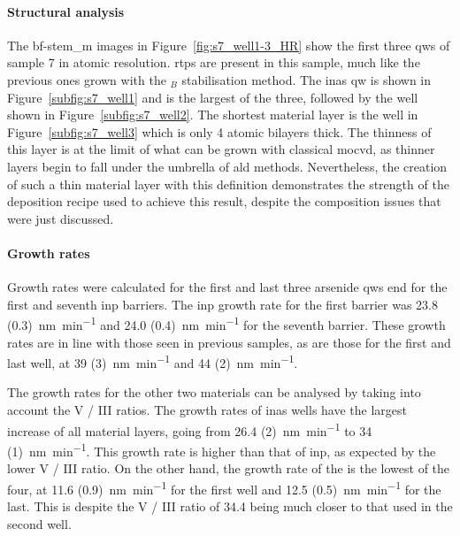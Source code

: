 \paragraph{Structural analysis} The \acs{bf}-\acs{stem_m} images in Figure~\ref{fig:s7_well1-3_HR} show the first three \acl{qw}s of sample 7 in atomic resolution. \Acl{rtp}s are present in this sample, much like the previous ones grown with the \(_B\) stabilisation method. The \acs{inas} \acs{qw} is shown in Figure~\ref{subfig:s7_well1} and is the largest of the three, followed by the  well shown in Figure~\ref{subfig:s7_well2}. The shortest material layer is the  well in Figure~\ref{subfig:s7_well3} which is only \num{4} atomic bilayers thick. The thinness of this layer is at the limit of what can be grown with classical \acs{mocvd}, as thinner layers begin to fall under the umbrella of \acf{ald} methods. Nevertheless, the creation of such a thin material layer with this definition demonstrates the strength of the deposition recipe used to achieve this result, despite the composition issues that were just discussed.
\par
\paragraph{Growth rates} Growth rates were calculated for the first and last three arsenide \acl{qw}s end for the first and seventh \acs{inp} barriers. The \acs{inp} growth rate for the first barrier was \qty[separate-uncertainty=true]{23.8 (0.3)}{\nano\metre\per\minute} and \qty[separate-uncertainty=true]{24.0 (0.4)}{\nano\metre\per\minute} for the seventh barrier. These growth rates are in line with those seen in previous samples, as are those for the first and last  well, at \qty[separate-uncertainty=true]{39 (3)}{\nano\metre\per\minute} and \qty[separate-uncertainty=true]{44 (2)}{\nano\metre\per\minute}.

The growth rates for the other two materials can be analysed by taking into account the V / III ratios. The growth rates of \acs{inas} wells have the largest increase of all material layers, going from \qty[separate-uncertainty=true]{26.4 (2)}{\nano\metre\per\minute} to \qty[separate-uncertainty=true]{34 (1)}{\nano\metre\per\minute}. This growth rate is higher than that of \acs{inp}, as expected by the lower V / III ratio. On the other hand, the growth rate of the  is the lowest of the four, at \qty[separate-uncertainty=true]{11.6 (0.9)}{\nano\metre\per\minute} for the first well and \qty[separate-uncertainty=true]{12.5 (0.5)}{\nano\metre\per\minute} for the last. This is despite the V / III ratio of \num{34.4} being much closer to that used in the second well.  

